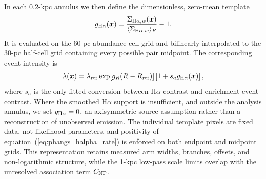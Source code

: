 \documentclass[fleqn,usenatbib]{mnras}
\newcommand{\bs}[1]{\boldsymbol{#1}}
\begin{document}
In each 0.2-kpc annulus we then define the dimensionless, zero-mean template
\begin{equation}
    g_{{\rm H}\alpha}(\bs{x})=
    \frac{\Sigma_{{\rm H}\alpha,w}(\bs{x})}
    {\langle\Sigma_{{\rm H}\alpha,w}\rangle_R}-1.
    \label{eq:phangs_halpha_template}
\end{equation}
It is evaluated on the 60-pc abundance-cell grid and bilinearly interpolated to the 30-pc half-cell grid containing every possible pair midpoint.  The corresponding event intensity is
\begin{equation}
    \lambda(\bs{x})=
    \lambda_{\rm ref}\exp[g_R(R-R_{\rm ref})]
    \left[1+s_a g_{{\rm H}\alpha}(\bs{x})\right],
    \label{eq:phangs_halpha_rate}
\end{equation}
where $s_a$ is the only fitted conversion between H$\alpha$ contrast and enrichment-event contrast.  Where the smoothed H$\alpha$ support is insufficient, and outside the analysis annulus, we set $g_{{\rm H}\alpha}=0$, an axisymmetric-source assumption rather than a reconstruction of unobserved emission.  The individual template pixels are fixed data, not likelihood parameters, and positivity of equation~(\ref{eq:phangs_halpha_rate}) is enforced on both endpoint and midpoint grids.  This representation retains measured arm widths, branches, offsets, and non-logarithmic structure, while the 1-kpc low-pass scale limits overlap with the unresolved association term $C_{\rm NP}$.
\end{document}
